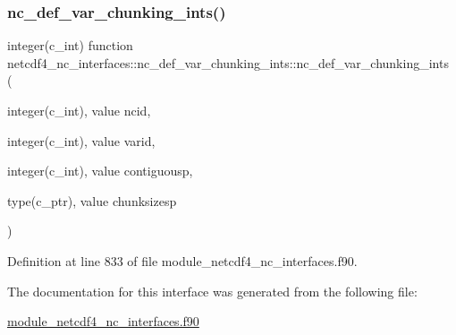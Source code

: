 \subsubsection{\texorpdfstring{nc\+\_\+def\+\_\+var\+\_\+chunking\+\_\+ints()}{nc\_def\_var\_chunking\_ints()}}
{\footnotesize\ttfamily integer(c\+\_\+int) function netcdf4\+\_\+nc\+\_\+interfaces\+::nc\+\_\+def\+\_\+var\+\_\+chunking\+\_\+ints\+::nc\+\_\+def\+\_\+var\+\_\+chunking\+\_\+ints (\begin{DoxyParamCaption}\item[{integer(c\+\_\+int), value}]{ncid,  }\item[{integer(c\+\_\+int), value}]{varid,  }\item[{integer(c\+\_\+int), value}]{contiguousp,  }\item[{type(c\+\_\+ptr), value}]{chunksizesp }\end{DoxyParamCaption})}



Definition at line 833 of file module\+\_\+netcdf4\+\_\+nc\+\_\+interfaces.\+f90.



The documentation for this interface was generated from the following file\+:\begin{DoxyCompactItemize}
\item 
\hyperlink{module__netcdf4__nc__interfaces_8f90}{module\+\_\+netcdf4\+\_\+nc\+\_\+interfaces.\+f90}\end{DoxyCompactItemize}
